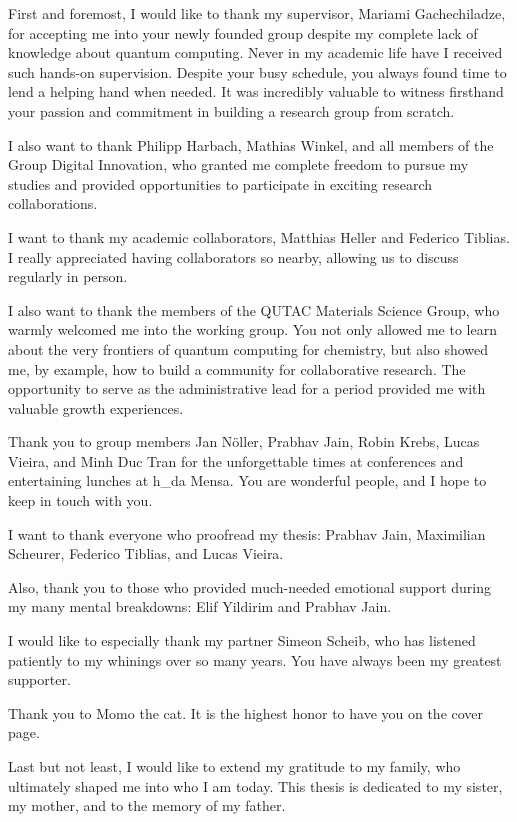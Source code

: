 \documentclass[../main.tex]{subfiles}
\begin{document}
First and foremost, I would like to thank my supervisor, Mariami Gachechiladze, for accepting me into your newly founded group despite my complete lack of knowledge about quantum computing. Never in my academic life have I received such hands-on supervision. Despite your busy schedule, you always found time to lend a helping hand when needed. It was incredibly valuable to witness firsthand your passion and commitment in building a research group from scratch.

I also want to thank Philipp Harbach, Mathias Winkel, and all members of the Group Digital Innovation, who granted me complete freedom to pursue my studies and provided opportunities to participate in exciting research collaborations.

I want to thank my academic collaborators, Matthias Heller and Federico Tiblias. I really appreciated having collaborators so nearby, allowing us to discuss regularly in person.

I also want to thank the members of the QUTAC Materials Science Group, who warmly welcomed me into the working group. You not only allowed me to learn about the very frontiers of quantum computing for chemistry, but also showed me, by example, how to build a community for collaborative research. The opportunity to serve as the administrative lead for a period provided me with valuable growth experiences.

Thank you to group members Jan Nöller, Prabhav Jain, Robin Krebs, Lucas Vieira, and Minh Duc Tran for the unforgettable times at conferences and entertaining lunches at h\_da Mensa. You are wonderful people, and I hope to keep in touch with you.

I want to thank everyone who proofread my thesis: Prabhav Jain, Maximilian Scheurer, Federico Tiblias, and Lucas Vieira.

Also, thank you to those who provided much-needed emotional support during my many mental breakdowns: Elif Yildirim and Prabhav Jain.

I would like to especially thank my partner Simeon Scheib, who has listened patiently to my whinings over so many years. You have always been my greatest supporter.

Thank you to Momo the cat. It is the highest honor to have you on the cover page.

Last but not least, I would like to extend my gratitude to my family, who ultimately shaped me into who I am today. This thesis is dedicated to my sister, my mother, and to the memory of my father.
\end{document}
